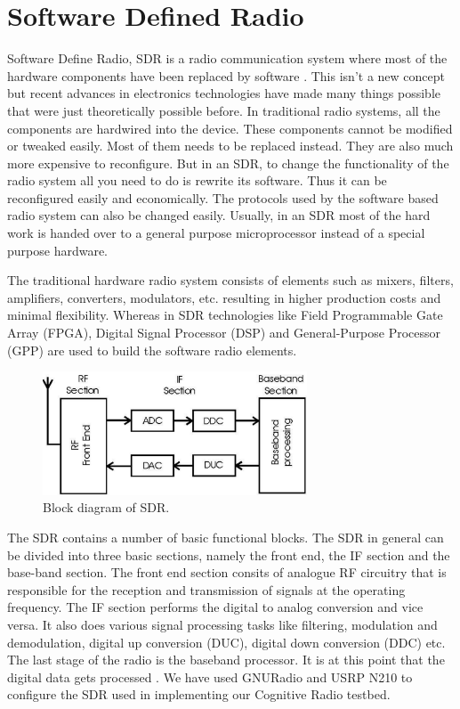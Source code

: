 \chapter{Software Defined Radio}

Software Define Radio, SDR is a radio communication system where most of the 
hardware components have been replaced by software \cite{wikiSDR}. This isn't
a new concept but recent advances in electronics technologies have made many
things possible that were just theoretically possible before. In traditional
radio systems, all the components are hardwired into the device. These 
components cannot be modified or tweaked easily. Most of them needs to be 
replaced instead. They are also much more expensive to reconfigure. But in an
SDR, to change the functionality of the radio system all you need to do is
rewrite its software. Thus it can be reconfigured easily and economically.
The protocols used by the software based radio system can also be changed
easily. Usually, in an SDR most of the hard work is handed over to a general
purpose microprocessor instead of a special purpose hardware.

The traditional hardware radio system consists of elements such as mixers, 
filters, amplifiers, converters, modulators, etc. resulting in higher 
production costs and minimal flexibility. Whereas in SDR technologies like 
Field Programmable Gate Array (FPGA), Digital Signal Processor (DSP) and 
General-Purpose Processor (GPP) are used to build the software radio elements.


\begin{figure}
  \centering
  \includegraphics[width=0.7\textwidth]{sdrBlock}
  \caption{Block diagram of SDR.}
  \label{sdrBlock}
\end{figure}

The SDR contains a number of basic functional blocks.
The SDR in general can be divided into three basic sections, namely the front
end, the IF section and the base-band section. The front end section consits 
of analogue RF circuitry that is responsible for the reception and 
transmission of signals at the operating frequency. The IF section performs
the digital to analog conversion and vice versa. It also does various signal 
processing tasks like filtering, modulation and demodulation, digital up 
conversion (DUC), digital down conversion (DDC) etc. The last stage of the 
radio is the baseband processor. It is at this point that the digital data 
gets processed \cite{miller08}\cite{kranthi13}.
We have used GNURadio and USRP N210 to configure the SDR used in implementing
our Cognitive Radio testbed. 

